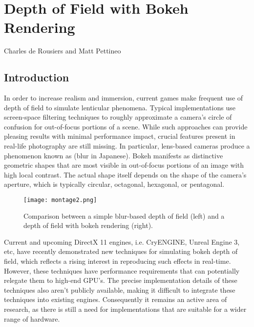 \chapter{Depth of Field with Bokeh Rendering}{Charles de Rousiers and Matt Pettineo}
\label{BokehRendering}

\section{Introduction}

In order to increase realism and immersion, current games make frequent use of depth of field to simulate lenticular phenomena. Typical implementations use screen-space filtering techniques to roughly approximate a camera's circle of confusion for out-of-focus portions of a scene. While such approaches can provide pleasing results with minimal performance impact, crucial features present in real-life photography are still missing. In particular, lens-based cameras produce a phenomenon known as \bokeh{} (blur in Japanese). Bokeh manifests as distinctive geometric shapes that are most visible in out-of-focus portions of an image with high local contrast. The actual shape itself depends on the shape of the camera’s aperture, which is typically circular, octagonal, hexagonal, or pentagonal.

	\begin{figure}[htb]\centering
	\texttt{[image: montage2.png]}
	\caption{Comparison between a simple blur-based depth of field (left) and a depth of field with bokeh rendering (right). }
	\label{Derousiers:blurcomparison}
	\end{figure}

Current and upcoming DirectX 11 engines, i.e. CryENGINE, Unreal Engine 3, etc, have recently demonstrated new techniques for simulating bokeh depth of field, which reflects a rising interest in reproducing such effects in real-time. However, these techniques have performance requirements that can potentially relegate them to high-end GPU's. The precise implementation details of these techniques also aren't publicly available, making it difficult to integrate these techniques into existing engines. Consequently it remains an active area of research, as there is still a need for implementations that are suitable for a wider range of hardware.


